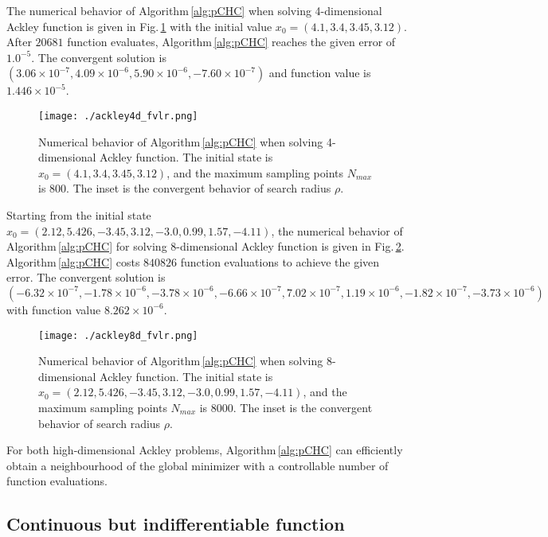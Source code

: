 \documentclass[mathpazo]{aamm}
\begin{document}
The numerical behavior of Algorithm\,\ref{alg:pCHC} when solving
4-dimensional Ackley function is given in Fig.\,\ref{fig:ackley4d} 
with the initial value $x_0=(4.1, 3.4, 3.45, 3.12)$. 
After $20681$ function evaluates, Algorithm\,\ref{alg:pCHC}
reaches the given error of $1.0^{-5}$. 
The convergent solution is $(3.06\times 10^{-7},
4.09\times 10^{-6}, 5.90\times 10^{-6}, -7.60\times 10^{-7})$ 
and function value is $1.446 \times 10^{-5}$. 
\begin{figure}[!htbp]
	\centering
	  \texttt{[image: ./ackley4d\_fvlr.png]}
	  \vspace{0.2cm}
	  \caption{Numerical behavior of Algorithm\,\ref{alg:pCHC} when
	  solving 4-dimensional Ackley function. The initial state is
	  $x_0=(4.1, 3.4, 3.45, 3.12)$, and the maximum sampling
	  points $N_{max}$ is $800$. The inset is the convergent
	  behavior of search radius $\rho$.
	  }
	\label{fig:ackley4d}
\end{figure}
Starting from the initial state
$x_0=(2.12, 5.426, -3.45, 3.12, -3.0, 0.99, 1.57, -4.11)$, 
the numerical behavior of Algorithm\,\ref{alg:pCHC} for solving
8-dimensional Ackley function is given in Fig.\,\ref{fig:ackley8d}.
Algorithm\,\ref{alg:pCHC} costs $840826$ function evaluations to
achieve the given error. The convergent
solution is $(-6.32\times 10^{-7}, -1.78\times 10^{-6},
-3.78\times 10^{-6}, -6.66\times 10^{-7}, 7.02\times 10^{-7},
1.19\times 10^{-6}, -1.82\times 10^{-7}, -3.73\times 10^{-6})$
with function value $8.262\times 10^{-6}$.
\begin{figure}[!htbp]
	\centering
	  \texttt{[image: ./ackley8d\_fvlr.png]}
	  \vspace{0.2cm}
	  \caption{Numerical behavior of Algorithm\,\ref{alg:pCHC}
	  when solving 8-dimensional Ackley function. The initial state is
	  $x_0=(2.12, 5.426, -3.45, 3.12, -3.0, 0.99, 1.57, -4.11)$,
	  and the maximum sampling points $N_{max}$ is $8000$. 
	  The inset is the convergent behavior of search radius $\rho$.
	  }
	\label{fig:ackley8d}
\end{figure}
For both high-dimensional Ackley problems,
Algorithm\,\ref{alg:pCHC} can efficiently obtain a neighbourhood
of the global minimizer with a controllable number of function
evaluations.

\subsection{Continuous but indifferentiable function}
\label{subsec:dwfun}
\end{document}
